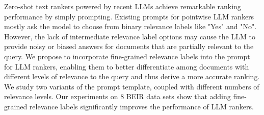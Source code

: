 Zero-shot text rankers powered by recent LLMs achieve remarkable ranking performance by simply prompting. Existing prompts for pointwise LLM rankers mostly ask the model to choose from binary relevance labels like "Yes" and "No". However, the lack of intermediate relevance label options may cause the LLM to provide noisy or biased answers for documents that are partially relevant to the query. We propose to incorporate fine-grained relevance labels into the prompt for LLM rankers, enabling them to better differentiate among documents with different levels of relevance to the query and thus derive a more accurate ranking. We study two variants of the prompt template, coupled with different numbers of relevance levels. Our experiments on 8 BEIR data sets show that adding fine-grained relevance labels significantly improves the performance of LLM rankers.